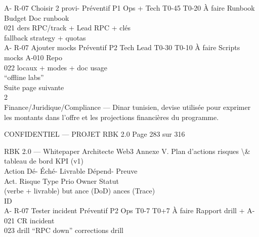 \documentclass[12pt,landscape,a4paper]{article}
\newenvironment{confidential}
{\begin{tcolorbox}[
    colback=rbkred!5!white,
    colframe=rbkred!75!black,
    title=CONFIDENTIEL,
    fonttitle=\bfseries\color{white},
    coltitle=rbkred!75!black,
    breakable,
    enhanced,
    frame hidden,
    borderline west={2pt}{0pt}{rbkred!75!black}
]}
{\end{tcolorbox}}
\begin{document}
A- R-07    Choisir 2 provi-      Préventif P1    Ops + Tech   T0-45 T0-20 À faire   Runbook         Budget     Doc runbook\\
021        ders RPC/track +                      Lead                               RPC + clés\\
fallback strategy                                                        + quotas\\
A- R-07    Ajouter mocks         Préventif P2    Tech Lead    T0-30 T0-10 À faire   Scripts mocks   A-010      Repo\\
022        locaux + modes                                                           + doc usage\\
“offline labs”\\
Suite page suivante\\
\vspace{0.5em}
\vspace{0.5em}
\vspace{0.5em}
2\\
Finance/Juridique/Compliance — Dinar tunisien, devise utilisée pour exprimer les montants dans l’offre et les projections financières du programme.\\
\vspace{0.5em}
\vspace{0.5em}
\begin{confidential}CONFIDENTIEL — PROJET RBK 2.0                                                     Page 283 sur 316\end{confidential}
RBK 2.0 — Whitepaper Architecte Web3                                                                Annexe V. Plan d’actions risques \textbackslash{}& tableau de bord KPI (v1)\\
\vspace{0.5em}
\vspace{0.5em}
Action                                          Dé- Éché-             Livrable        Dépend- Preuve\\
Act. Risque                      Type      Prio Owner                   Statut\\
(verbe + livrable)                              but ance              (DoD)           ances   (Trace)\\
ID\\
A- R-07     Tester incident      Préventif P2   Ops         T0-7 T0+7 À faire     Rapport drill + A-021      CR incident\\
023         drill “RPC down”                                                      corrections                drill\\
\end{document}
